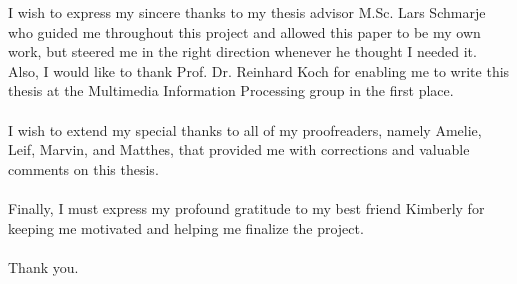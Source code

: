 
\begin{acknowledgements}      

    I wish to express my sincere thanks to my thesis advisor M.Sc. Lars Schmarje who guided me throughout this project and allowed this paper to be my own work, but steered me in the right direction whenever he thought I needed it. Also, I would like to thank Prof. Dr. Reinhard Koch for enabling me to write this thesis at the Multimedia Information Processing group in the first place.\\
    \\I wish to extend my special thanks to all of my proofreaders, namely Amelie, Leif, Marvin, and Matthes, that provided me with corrections and valuable comments on this thesis.\\
    \\Finally, I must express my profound gratitude to my best friend Kimberly for keeping me motivated and helping me finalize the project.\\
    \\Thank you. 


\end{acknowledgements}
